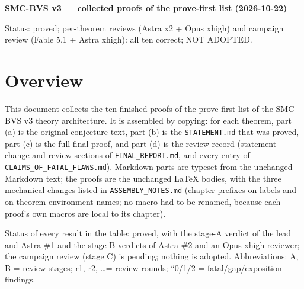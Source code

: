 \documentclass[11pt]{report}
\begin{document}
\begin{center}
{\LARGE\bfseries SMC-BVS v3 — collected proofs of the prove-first list (2026-10-22)\par}
\vspace{0.8em}
{\large Status: proved; per-theorem reviews (Astra x2 + Opus xhigh) and campaign review (Fable 5.1 + Astra xhigh): all ten correct; NOT ADOPTED.\par}
\end{center}

\tableofcontents
\chapter*{Overview}
\noindent This document collects the ten finished proofs of the prove-first list of the SMC-BVS v3 theory architecture. It is assembled by copying: for each theorem, part (a) is the original conjecture text, part (b) is the \texttt{STATEMENT.md} that was proved, part (c) is the full final proof, and part (d) is the review record (statement-change and review sections of \texttt{FINAL\_REPORT.md}, and every entry of \texttt{CLAIMS\_OF\_FATAL\_FLAWS.md}). Markdown parts are typeset from the unchanged Markdown text; the proofs are the unchanged \LaTeX{} bodies, with the three mechanical changes listed in \texttt{ASSEMBLY\_NOTES.md} (chapter prefixes on labels and on theorem-environment names; no macro had to be renamed, because each proof's own macros are local to its chapter).

\noindent Status of every result in the table: proved, with the stage-A verdict of the lead and Astra \#1 and the stage-B verdicts of Astra \#2 and an Opus xhigh reviewer; the campaign review (stage C) is pending; nothing is adopted. Abbreviations: A, B = review stages; r1, r2, \dots = review rounds; ``0/1/2 = fatal/gap/exposition findings.
\end{document}
